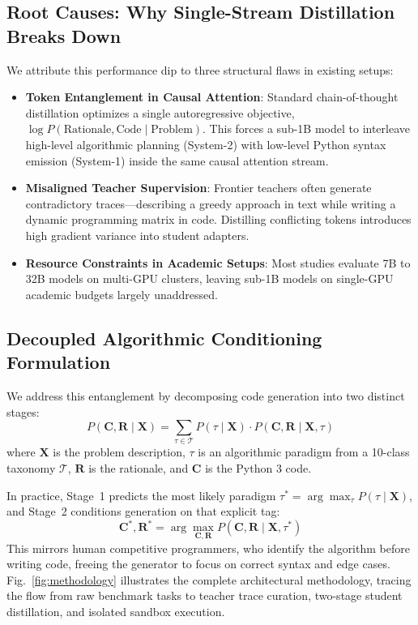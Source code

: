 \documentclass[journal]{IEEEtran}
\begin{document}
\subsection{Root Causes: Why Single-Stream Distillation Breaks Down}
We attribute this performance dip to three structural flaws in existing setups:
\begin{itemize}
    \item \textbf{Token Entanglement in Causal Attention}: Standard chain-of-thought distillation optimizes a single autoregressive objective, $\log P(\text{Rationale}, \text{Code} \mid \text{Problem})$. This forces a sub-1B model to interleave high-level algorithmic planning (System-2) with low-level Python syntax emission (System-1) inside the same causal attention stream.
    \item \textbf{Misaligned Teacher Supervision}: Frontier teachers often generate contradictory traces---describing a greedy approach in text while writing a dynamic programming matrix in code. Distilling conflicting tokens introduces high gradient variance into student adapters.
    \item \textbf{Resource Constraints in Academic Setups}: Most studies evaluate 7B to 32B models on multi-GPU clusters, leaving sub-1B models on single-GPU academic budgets largely unaddressed.
\end{itemize}

\subsection{Decoupled Algorithmic Conditioning Formulation}
We address this entanglement by decomposing code generation into two distinct stages:
\begin{equation}
\label{eq:decoupled}
P(\mathbf{C}, \mathbf{R} \mid \mathbf{X}) = \sum_{\tau \in \mathcal{T}} P(\tau \mid \mathbf{X}) \cdot P(\mathbf{C}, \mathbf{R} \mid \mathbf{X}, \tau)
\end{equation}
where $\mathbf{X}$ is the problem description, $\tau$ is an algorithmic paradigm from a 10-class taxonomy $\mathcal{T}$, $\mathbf{R}$ is the rationale, and $\mathbf{C}$ is the Python 3 code.

In practice, Stage~1 predicts the most likely paradigm $\tau^* = \arg\max_\tau P(\tau \mid \mathbf{X})$, and Stage~2 conditions generation on that explicit tag:
\begin{equation}
\label{eq:stage2_map}
\mathbf{C}^*, \mathbf{R}^* = \arg\max_{\mathbf{C}, \mathbf{R}} P(\mathbf{C}, \mathbf{R} \mid \mathbf{X}, \tau^*)
\end{equation}
This mirrors human competitive programmers, who identify the algorithm before writing code, freeing the generator to focus on correct syntax and edge cases. Fig.~\ref{fig:methodology} illustrates the complete architectural methodology, tracing the flow from raw benchmark tasks to teacher trace curation, two-stage student distillation, and isolated sandbox execution.
\end{document}
